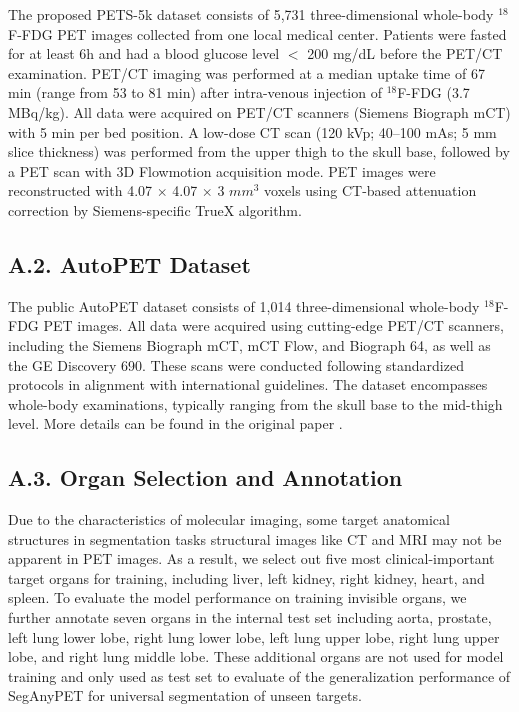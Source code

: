 The proposed PETS-5k dataset consists of 5,731 three-dimensional whole-body $^{18}$F-FDG PET images collected from one local medical center. 
Patients were fasted for at least 6h and had a blood glucose level $<$ 200 mg/dL before the PET/CT examination. PET/CT imaging was performed at a median uptake time of 67 min (range from 53 to 81 min) after intra-venous injection of $^{18}$F-FDG (3.7 MBq/kg).
All data were acquired on PET/CT scanners (Siemens Biograph mCT) with 5 min per bed position. A low-dose CT scan (120 kVp; 40–100 mAs; 5 mm slice thickness) was performed from the upper thigh to the skull base, followed by a PET scan with 3D Flowmotion acquisition mode. PET images were reconstructed with 4.07 $\times$ 4.07 $\times$ 3 $mm^{3}$ voxels using CT-based attenuation correction by Siemens-specific TrueX algorithm.


\subsection*{A.2. AutoPET Dataset}

The public AutoPET dataset consists of 1,014 three-dimensional whole-body $^{18}$F-FDG PET images.
All data were acquired using cutting-edge PET/CT scanners, including the Siemens Biograph mCT, mCT Flow, and Biograph 64, as well as the GE Discovery 690. These scans were conducted following standardized protocols in alignment with international guidelines. The dataset encompasses whole-body examinations, typically ranging from the skull base to the mid-thigh level. More details can be found in the original paper \cite{AutoPET}.


\subsection*{A.3. Organ Selection and Annotation}

Due to the characteristics of molecular imaging, some target anatomical structures in segmentation tasks structural images like CT and MRI may not be apparent in PET images. As a result, we select out five most clinical-important target organs for training, including liver, left kidney, right kidney, heart, and spleen. 
To evaluate the model performance on training invisible organs, we further annotate seven organs in the internal test set including aorta, prostate, left lung lower lobe, right lung lower lobe, left lung upper lobe, right lung upper lobe, and right lung middle lobe.
These additional organs are not used for model training and only used as test set to evaluate of the generalization performance of SegAnyPET for universal segmentation of unseen targets.

